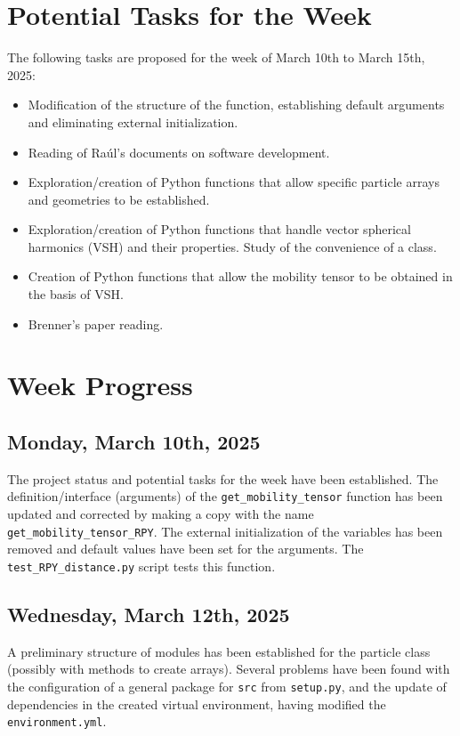 \documentclass[12pt]{article}
\begin{document}
\section{Potential Tasks for the Week}
The following tasks are proposed for the week of March 10th to March 15th, 2025:
\begin{itemize}
    \item Modification of the structure of the  function, establishing default arguments and eliminating external initialization.
    \item Reading of Raúl's documents on software development.
    \item Exploration/creation of Python functions that allow specific particle arrays and geometries to be established.
    \item Exploration/creation of Python functions that handle vector spherical harmonics (VSH) and their properties. Study of the convenience of a class.
    \item Creation of Python functions that allow the mobility tensor to be obtained in the basis of VSH.
    \item Brenner's paper \cite{BRENNER1961242} reading.
\end{itemize}

\section{Week Progress}

\subsection{Monday, March 10th, 2025}
The project status and potential tasks for the week have been established.
The definition/interface (arguments) of the
\texttt{get\_mobility\_tensor} function has been updated
and corrected by making a copy with the name
\texttt{get\_mobility\_tensor\_RPY}. The external initialization
of the variables has been removed and default values have been
set for the arguments. The \texttt{test\_RPY\_distance.py}
script tests this function.

\subsection{Wednesday, March 12th, 2025}
A preliminary structure of modules has been established for the
particle class (possibly with methods to create arrays). Several
problems have been found with the configuration of a general package
for \texttt{src} from \texttt{setup.py}, and the update of
dependencies in the created virtual environment, having modified
the \texttt{environment.yml}.
\end{document}
